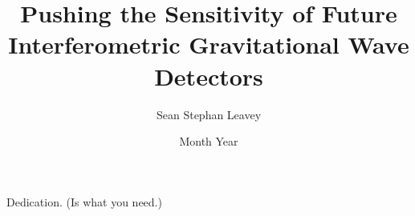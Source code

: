 
\title{Pushing the Sensitivity of Future Interferometric Gravitational Wave Detectors}
\author{Sean Stephan Leavey}
\date{Month Year}

\maketitle

\cleardoublepage

 

\newpage
 

\cleardoublepage
\vspace*{1.75in}
\begin{flushright} Dedication. (Is what you need.)\end{flushright}








\tableofcontents
\listoftables
\listoffigures

\cleardoublepage

